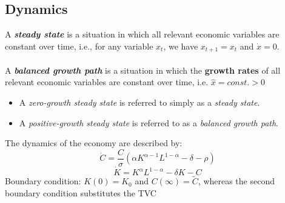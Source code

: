 \subsection{Dynamics}
\begin{tcolorbox}[
    colback=red!5!white, %
    colframe=red!40!white, %
    title=Definition: Steady State and Balanced Growth Path, %
    fonttitle=\bfseries %
]

A \textbf{\emph{steady state}} is a situation in which all relevant economic variables are constant over time, i.e., for any variable $x_t$, we have $x_{t+1} = x_t$ and $\dot{x}=0$. \\\\
A \textbf{\emph{balanced growth path}} is a situation in which the \textbf{growth rates} of all relevant economic variables are constant over time, i.e. $\hat{x}=const.>0$


\begin{itemize}
    \item A \emph{zero-growth steady state} is referred to simply as a \emph{steady state}.
    \item A \emph{positive-growth steady state} is referred to as a \emph{balanced growth path}.
\end{itemize}

\end{tcolorbox}



The dynamics of the economy are described by: 
$$\dot{C} = \frac{C}{\sigma}\left(\alpha K^{\alpha - 1} L^{1-\alpha} - \delta - \rho \right)$$
$$\dot{K} = K^{\alpha} L^{1-\alpha} - \delta K - C$$
Boundary condition: $K(0)=K_0$ and $C(\infty)=\tilde{C}$, whereas the second boundary condition substitutes the TVC\\\\

